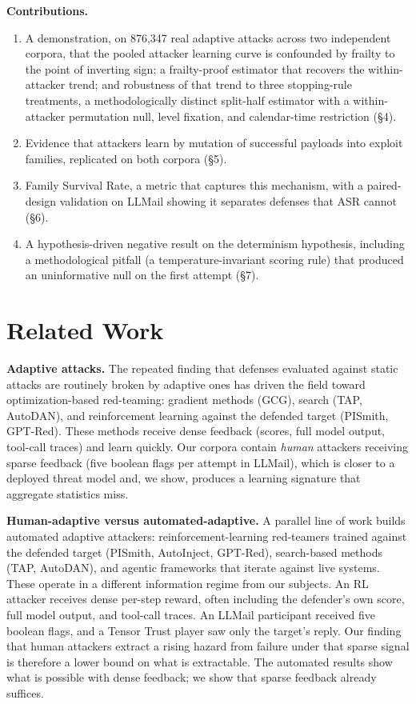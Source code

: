 \documentclass[conference]{IEEEtran}
\begin{document}
\textbf{Contributions.}

\begin{enumerate}
\item A demonstration, on 876,347 real adaptive attacks across two independent corpora, that the pooled attacker learning curve is confounded by frailty to the point of inverting sign; a frailty-proof estimator that recovers the within-attacker trend; and robustness of that trend to three stopping-rule treatments, a methodologically distinct split-half estimator with a within-attacker permutation null, level fixation, and calendar-time restriction (\S4).
\item Evidence that attackers learn by mutation of successful payloads into exploit families, replicated on both corpora (\S5).
\item Family Survival Rate, a metric that captures this mechanism, with a paired-design validation on LLMail showing it separates defenses that ASR cannot (\S6).
\item A hypothesis-driven negative result on the determinism hypothesis, including a methodological pitfall (a temperature-invariant scoring rule) that produced an uninformative null on the first attempt (\S7).
\end{enumerate}


\section{Related Work}

\textbf{Adaptive attacks.} The repeated finding that defenses evaluated against static attacks are routinely broken by adaptive ones \cite{attackerMovesSecond} has driven the field toward optimization-based red-teaming: gradient methods (GCG), search (TAP, AutoDAN), and reinforcement learning against the defended target (PISmith, GPT-Red). These methods receive dense feedback (scores, full model output, tool-call traces) and learn quickly. Our corpora contain \textit{human} attackers receiving sparse feedback (five boolean flags per attempt in LLMail), which is closer to a deployed threat model and, we show, produces a learning signature that aggregate statistics miss.

\textbf{Human-adaptive versus automated-adaptive.} A parallel line of work builds automated adaptive attackers: reinforcement-learning red-teamers trained against the defended target (PISmith, AutoInject, GPT-Red), search-based methods (TAP, AutoDAN), and agentic frameworks that iterate against live systems. These operate in a different information regime from our subjects. An RL attacker receives dense per-step reward, often including the defender's own score, full model output, and tool-call traces. An LLMail participant received five boolean flags, and a Tensor Trust player saw only the target's reply. Our finding that human attackers extract a rising hazard from failure under that sparse signal is therefore a lower bound on what is extractable. The automated results show what is possible with dense feedback; we show that sparse feedback already suffices.
\end{document}

